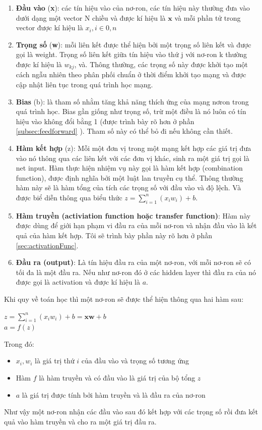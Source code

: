 \begin{enumerate}
\setlength{\itemindent}{5mm}
	\item \textbf{Đầu vào} (\textbf{x}): các tín hiệu vào của nơ-ron, các tín hiệu này thường đưa vào dưới dạng một vector N chiều và được kí hiệu là $\textbf{x}$ và mỗi phần tử trong vector được kí hiệu là $x_i, i\in{0,n}$
	\item \textbf{Trọng số} (\textbf{w}): mỗi liên kết được thể hiện bởi một trọng số liên kết và được gọi là weight. Trọng số liên kết giữa tín hiệu vào thứ j với nơ-ron k thường được kí hiệu là $w_{kj}$, và. Thông thường, các trọng số này được khởi tạo một cách ngẫu nhiên theo phân phối chuẩn ở thời điểm khởi tạo mạng và được cập nhật liên tục trong quá trình học mạng.

	\item \textbf{Bias} (b): là tham số nhằm tăng khả năng thích ứng của mạng nơron trong quá trình học. Bias gần giống như trọng số, trừ một điều là nó luôn có tín hiệu vào không đổi bằng 1 (được trình bày rõ hơn ở phần \ref{subsec:feedforward} ). Tham số này có thể bỏ đi nếu không cần thiết.	
	
	\item \textbf{Hàm kết hợp} (z): Mỗi một đơn vị trong một mạng kết hợp các giá trị đưa vào nó thông qua các liên kết với các đơn vị khác, sinh ra một giá trị gọi là net input. Hàm thực hiện nhiệm vụ này  gọi là hàm kết hợp (combination function), được định nghĩa bởi một luật lan truyền cụ thể. Thông thường hàm này sẽ là hàm tổng của tích các trọng số với đầu vào và độ lệch. Và được biể diễn thông qua biểu thức $z = \sum_{i=1}^n(x_iw_i) +b$.
	\item \textbf{Hàm truyền (activiation function hoặc transfer function)}: Hàm này được dùng để giới hạn phạm vi đầu ra của mỗi nơ-ron và nhận đầu vào là kết quả của hàm kết hợp. Tôi sẽ trình bày phần này rõ hơn ở phần \ref{sec:activationFunc}.
	\item \textbf{Đầu ra (output)}: Là tín hiệu đầu ra của một nơ-ron, với mỗi nơ-ron sẽ có tối đa là một đầu ra. Nếu như nơ-ron đó ở các hidden layer thì đầu ra của nó được gọi là activation và được kí hiệu là $a$.
\end{enumerate} \par
Khi quy về toán học thì một nơ-ron sẽ được thể hiện thông qua hai hàm sau:
\begin{center}
$z = \sum_{i=1}^n(x_iw_i)+b = \textbf{x}\textbf{w}+b$\\[5pt]
$a = f(z)$
\end{center}
\par
Trong đó:
\begin{itemize}
\setlength{\itemindent}{5mm}
	\item[\textendash] $x_i,w_i$ là giá trị thứ $i$ của đầu vào và trọng số tương ứng
	\item[\textendash] Hàm $f$ là hàm truyền và có đầu vào là giá trị của bộ tổng $z$
	\item[\textendash] $a$ là giá trị được tính bởi hàm truyền và là đầu ra của nơ-ron
\end{itemize}
\par
Như vậy một nơ-ron nhận các đầu vào sau đó kết hợp với các trọng số rồi đưa kết quả vào hàm truyền và cho ra một giá trị đầu ra.

